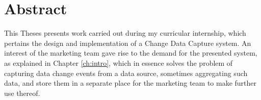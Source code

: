 \chapter*{Abstract} %
\label{ch:abstract}


%


%
%
%


This Theses presents work carried out during my curricular internship, which pertains the design and implementation of a Change Data Capture system.
An interest of the marketing team gave rise to the demand for the presented system, as explained in Chapter \ref{ch:intro}, which in essence solves the problem of capturing data change events from a data source, sometimes aggregating such data, and store them in a separate place for the marketing team to make further use thereof.

